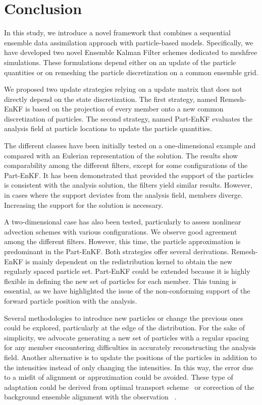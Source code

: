 
\section{Conclusion}
In this study, we introduce a novel framework that combines a sequential ensemble data assimilation approach with particle-based models. Specifically, we have developed two novel Ensemble Kalman Filter schemes dedicated to meshfree simulations. These formulations depend either on an update of the particle quantities or on remeshing the particle discretization on a common ensemble grid.

We proposed two update strategies relying on a update matrix that does not directly depend on the state discretization. The first strategy, named Remesh-EnKF is based on the projection of every member onto a new common discretization of particles. The second strategy, named Part-EnKF evaluates the analysis field at particle locations to update the particle quantities.

The different classes have been initially tested on a one-dimensional example and compared with an Eulerian representation of the solution. The results show comparability among the different filters, except for some configurations of the Part-EnKF. It has been demonstrated that provided the support of the particles is consistent with the analysis solution, the filters yield similar results. However, in cases where the support deviates from the analysis field, members diverge. Increasing the support for the solution is necessary.

A two-dimensional case has also been tested, particularly to assess nonlinear advection schemes with various configurations. We observe good agreement among the different filters. However, this time, the particle approximation is predominant in the Part-EnKF.
Both strategies offer several derivations. Remesh-EnKF is mainly dependent on the redistribution kernel to obtain the new regularly spaced particle set. Part-EnKF could be extended because it is highly flexible in defining the new set of particles for each member. This tuning is essential, as we have highlighted the issue of the non-conforming support of the forward particle position with the analysis.

Several methodologies to introduce new particles or change the previous ones could be explored, particularly at the edge of the distribution.
For the sake of simplicity, we advocate generating a new set of particles with a regular spacing for any member encountering difficulties in accurately reconstructing the analysis field.
Another alternative is to update the positions of the particles in addition to the intensities instead of only changing the intensities. In this way, the error due to a misfit of alignment or approximation could be avoided. These type of adaptation could be derived from optimal transport scheme~\cite{bocquet_bridging_2023} or correction of the background ensemble alignment with the observation~\cite{ravela_data_2007,rosenthal_displacement_2017} .

\newpage